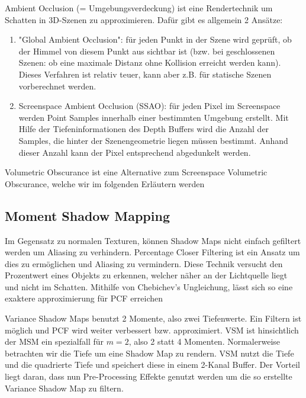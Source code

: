 \documentclass[runningheaders,a4paper]{llncs}
\begin{document}
Ambient Occlusion (= Umgebungsverdeckung) ist eine Rendertechnik um Schatten in 3D-Szenen
zu approximieren. Dafür gibt es allgemein 2 Ansätze:
\begin{enumerate}
	\item "Global Ambient Occlusion": für jeden Punkt in der Szene wird geprüft, ob der Himmel von diesem
		Punkt aus sichtbar ist (bzw. bei geschlossenen Szenen: ob eine maximale Distanz ohne Kollision erreicht
		 werden kann). Dieses Verfahren ist relativ teuer, kann aber z.B. für statische Szenen vorberechnet
		 werden.
		\cite{aoPaper}
	\item Screenspace Ambient Occlusion (SSAO): für jeden Pixel im Screenspace werden Point Samples
		innerhalb einer bestimmten Umgebung erstellt. Mit Hilfe der Tiefeninformationen des Depth Buffers
		wird die Anzahl der Samples, die hinter der Szenengeometrie liegen müssen bestimmt. Anhand dieser Anzahl
		kann der Pixel entsprechend abgedunkelt werden.  \cite{cry2Paper}
\end{enumerate}  
Volumetric Obscurance ist eine Alternative zum Screenspace Volumetric Obscurance, welche wir im folgenden
Erläutern werden

\cite{loos2010volumetric}

\subsection{Moment Shadow Mapping}

Im Gegensatz zu normalen Texturen, können Shadow Maps nicht einfach gefiltert werden um Aliasing zu verhindern. 
Percentage Closer Filtering ist ein Ansatz um dies zu ermöglichen und Aliasing zu vermindern. Diese Technik versucht den Prozentwert eines Objekts zu erkennen, welcher näher an der Lichtquelle liegt und nicht im Schatten. 
Mithilfe von Chebichev's Ungleichung, lässt sich so eine exaktere approximierung für PCF erreichen \cite{reeves1987rendering}

Variance Shadow Maps benutzt 2 Momente, also zwei Tiefenwerte. Ein Filtern ist möglich und PCF wird weiter verbessert bzw. approximiert. VSM ist hinsichtlich der MSM ein spezialfall für $m = 2$, also 2 statt 4 Momenten. Normalerweise betrachten wir die Tiefe um eine Shadow Map zu rendern. VSM nutzt die Tiefe und die quadrierte Tiefe und speichert diese in einem 2-Kanal Buffer. Der Vorteil liegt daran, dass nun Pre-Processing Effekte genutzt werden um die so erstellte Variance Shadow Map zu filtern.\cite{donnelly2006variance}
\end{document}
